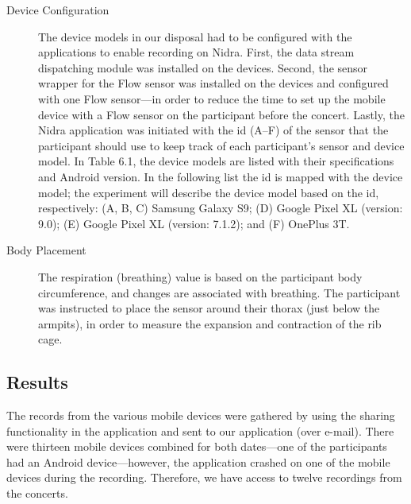\begin{description}
    \item[Device Configuration] The device models in our disposal had to be configured with the applications to enable recording on Nidra. First, the data stream dispatching module was installed on the devices. Second, the sensor wrapper for the Flow sensor was installed on the devices and configured with one Flow sensor---in order to reduce the time to set up the mobile device with a Flow sensor on the participant before the concert. Lastly, the Nidra application was initiated with the id (A--F) of the sensor that the participant should use to keep track of each participant's sensor and device model. In Table 6.1, the device models are listed with their specifications and Android version. In the following list the id is mapped with the device model; the experiment will describe the device model based on the id, respectively: (A, B, C) Samsung Galaxy S9; (D) Google Pixel XL (version: 9.0); (E) Google Pixel XL (version: 7.1.2); and (F) OnePlus 3T. 
    \item[Body Placement] The respiration (breathing) value is based on the participant body circumference, and changes are associated with breathing. The participant was instructed to place the sensor around their thorax (just below the armpits), in order to measure the expansion and contraction of the rib cage.

\end{description}

\subsection{Results}

The records from the various mobile devices were gathered by using the sharing functionality in the application and sent to our application (over e-mail). There were thirteen mobile devices combined for both dates---one of the participants had an Android device---however, the application crashed on one of the mobile devices during the recording. Therefore, we have access to twelve recordings from the concerts. 

